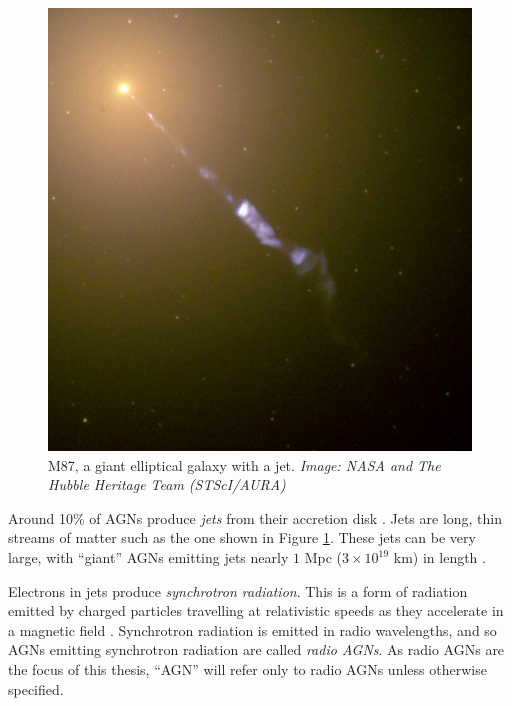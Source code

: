         \begin{figure}
            \centering
            \includegraphics[height=0.3\textheight]{images/M87_jet.jpg}
            \caption{M87, a giant elliptical galaxy with a jet. \emph{Image:
                NASA and The Hubble Heritage Team (STScI/AURA)}}
            \label{fig:m87}
        \end{figure}

        Around 10\% of AGNs produce \emph{jets} from their accretion disk
        \citep{fabian99}. Jets are long, thin streams of matter such as the one
        shown in Figure \ref{fig:m87}. These jets can be very large, with
        ``giant'' AGNs emitting jets nearly $1$ Mpc ($3 \times 10^{19}$ km) in
        length \citep{saripalli05}.

        Electrons in jets produce \emph{synchrotron radiation}. This is a
        form of radiation emitted by charged particles travelling at
        relativistic speeds as they accelerate in a magnetic field
        \citep{sokolov67}. Synchrotron radiation is emitted in radio
        wavelengths, and so AGNs emitting synchrotron radiation are called
        \emph{radio AGNs}. As radio AGNs are the focus of this thesis, ``AGN''
        will refer only to radio AGNs unless otherwise specified.

